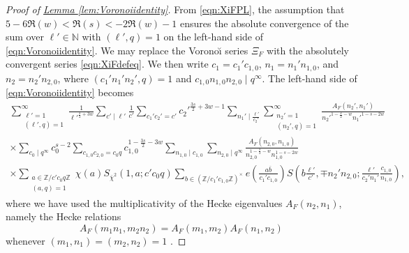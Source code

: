 \documentclass[11pt,a4paper]{amsart}
\newcommand{\N}{\mathbb{N}}
\newcommand{\Z}{\mathbb{Z}}
\numberwithin{equation}{section}
\theoremstyle{remark}
\theoremstyle{definition}
\begin{document}
\begin{proof}[Proof of {\hyperref[lem:Voronoiidentity]{Lemma \ref*{lem:Voronoiidentity}}}]
From \eqref{eqn:XiFPL}, the assumption that $5 - 6\Re(w) < \Re(s) < -2\Re(w) - 1$ ensures the absolute convergence of the sum over $\ell' \in \N$ with $(\ell',q) = 1$ on the left-hand side of \eqref{eqn:Voronoiidentity}. We may replace the Vorono\u{\i} series $\Xi_F$ with the absolutely convergent series \eqref{eqn:XiFdefeq}. We then write $c_1 = c_1' c_{1,0}$, $n_1 = n_1' n_{1,0}$, and $n_2 = n_2' n_{2,0}$, where $(c_1' n_1' n_2',q) = 1$ and $c_{1,0} n_{1,0} n_{2,0} \mid q^{\infty}$. The left-hand side of \eqref{eqn:Voronoiidentity} becomes
\begin{multline}
\label{eqn:openVoronoi1}
\sum_{\substack{\ell' = 1 \\ (\ell',q) = 1}}^{\infty} \frac{1}{{\ell'}^{\frac{s}{2} + 3w}} \sum_{c' \mid \ell'} \frac{1}{c'} \sum_{c_1' c_2' = c'} {c_2'}^{\frac{3s}{2} + 3w - 1} \sum_{n_1' \mid \frac{\ell'}{c_2'}} \sum_{\substack{n_2' = 1 \\ (n_2',q) = 1}}^{\infty} \frac{A_F(n_2',n_1')}{{n_2'}^{1 - \frac{s}{2} - w} {n_1'}^{1 - s - 2w}}	\\
\times \sum_{c_0 \mid q^{\infty}} c_0^{s - 2} \sum_{c_{1,0} c_{2,0} = c_0 q} c_{1,0}^{1 - \frac{3s}{2} - 3w} \sum_{n_{1,0} \mid c_{1,0}} \sum_{n_{2,0} \mid q^{\infty}} \frac{A_F(n_{2,0},n_{1,0})}{n_{2,0}^{1 - \frac{s}{2} - w} n_{1,0}^{1 - s - 2w}}	\\
\times \sum_{\substack{a \in \Z/c' c_0 q\Z \\ (a,q) = 1}} \chi(a) S_{\overline{\chi}^2}(1,a;c' c_0 q) \sum_{b \in (\Z/c_1' c_{1,0} \Z)^{\times}} e\left(\frac{a\overline{b}}{c_1' c_{1,0}}\right) S\left(b\frac{\ell'}{c'}, \mp n_2' n_{2,0}; \frac{\ell'}{c_2' n_1'} \frac{c_{1,0}}{n_{1,0}}\right),
\end{multline}
where we have used the multiplicativity of the Hecke eigenvalues $A_F(n_2,n_1)$, namely the Hecke relations
\[A_F(m_1 n_1,m_2 n_2) = A_F(m_1,m_2) A_F(n_1,n_2)\]
whenever $(m_1,n_1) = (m_2,n_2) = 1$ \cite[Theorem 6.4.11]{Gol06}.


\end{proof}
\end{document}
